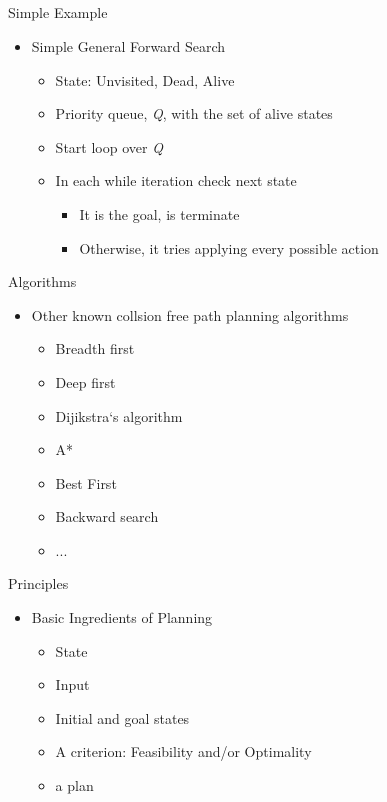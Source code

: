 \documentclass[%
  professionalfonts,%
  xcolor={%
    usenames,%
    dvipsnames,%
    svgnames,%
    table,%
    hyperref%
  }%
]{beamer}
\begin{document}
    \subsection*{}
    \begin{frame}{Simple Example}
      \begin{itemize}
        \item Simple General Forward Search
        \begin{itemize}
          \item State: Unvisited, Dead, Alive
          \item Priority queue, \emph{Q}, with the set of alive states
          \item Start loop over \emph{Q}
          \item In each while iteration check next state
          \begin{itemize}
            \item It is the goal, is terminate
            \item Otherwise, it tries applying every possible action
           \end{itemize} 
        \end{itemize}
      \end{itemize}
      
      
    \end{frame}
    
    \begin{frame}{Algorithms}
      \begin{itemize}
        \item Other known collsion free path planning algorithms
        \begin{itemize}
          \item Breadth first
          \item Deep first
          \item Dijikstra‘s algorithm
          \item A*
          \item Best First
          \item Backward search
          \item ...
        \end{itemize}
      \end{itemize}
    \end{frame}

    \begin{frame}{Principles}
      \begin{itemize}
        \item Basic Ingredients of Planning
        \begin{itemize}
          \item State
          \item Input
          \item Initial and goal states
          \item A criterion: Feasibility and/or Optimality
          \item a plan
        \end{itemize}
      \end{itemize}
    \end{frame}
    
\end{document}
